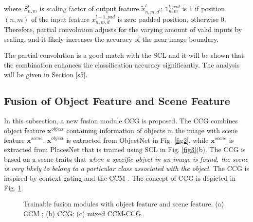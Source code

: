 \documentclass[journal,comsoc]{IEEEtran}
\begin{document}
where $S_{n,m}^l$ is scaling factor of output feature $\widetilde x_{n,m,{d^l}}^l$; ${\mathds{1}}_{n,m}^{l;pad}$ is 1 if position $\left( {n,m} \right)$ of the input feature $x_{n,m,d}^{l - 1,pad}$ is zero padded position, otherwise 0. Therefore, partial convolution adjusts for the varying amount of valid inputs by scaling, and it likely increases the accuracy of the near image boundary.

The partial convolution is a good match with the SCL and it will be shown that the combination enhances the classification accuracy significantly. The analysis will be given in Section \ref{s5}. 


\subsection{Fusion of Object Feature and Scene Feature}
\label{s33}

In this subsection, a new fusion module CCG is proposed. The CCG combines object feature $\bm{x}^{object}$ containing information of objects in the image with scene feature $\bm{x}^{scene}$. $\bm{x}^{object}$ is extracted from ObjectNet in Fig. \ref{fig2}, while $\bm{x}^{scene}$ is extracted from PlacesNet that is trained using SCL in Fig. \ref{fig3}(b). The CCG is based on a scene traits that \textit{when a specific object in an image is found, the scene is very likely to belong to a particular class associated with the object}. The CCG is inspired by context gating \cite{b22} and the CCM \cite{b21}. The concept of CCG is depicted in Fig. \ref{fig7}.





\begin{figure}[!t]
\centering
{}


\caption{Trainable fusion modules with object feature and scene feature. (a) CCM \cite{b21}; (b) CCG; (c) mixed CCM-CCG.}
\label{fig7}
\end{figure}
\end{document}
